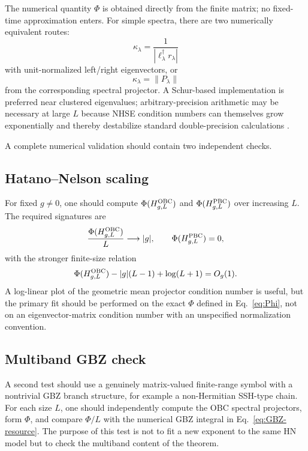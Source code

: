 \documentclass[reprint,amsmath,amssymb,aps,nofootinbib]{revtex4-2}
\newcommand{\norm}[1]{\left\lVert #1\right\rVert}
\newcommand{\PhiC}{\Phi}
\begin{document}
The numerical quantity \(\PhiC\) is obtained directly from the finite matrix;
no fixed-time approximation enters. For simple spectra, there are two
numerically equivalent routes:
\begin{equation}
\kappa_\lambda=\frac{1}{|\ell_\lambda^\dagger r_\lambda|}
\end{equation}
with unit-normalized left/right eigenvectors, or
\begin{equation}
\kappa_\lambda=\norm{P_\lambda}
\end{equation}
from the corresponding spectral projector. A Schur-based implementation is
preferred near clustered eigenvalues; arbitrary-precision arithmetic may be
necessary at large $L$ because NHSE condition numbers can themselves grow
exponentially and thereby destabilize standard double-precision
calculations \cite{FengEtAl2025}.

A complete numerical validation should contain two independent checks.

\subsection{Hatano--Nelson scaling}
For fixed $g\ne0$, one should compute \(\PhiC(H_{g,L}^{\rm OBC})\) and
\(\PhiC(H_{g,L}^{\rm PBC})\) over increasing $L$. The required signatures are
\begin{equation}
\frac{\PhiC(H_{g,L}^{\rm OBC})}{L}\longrightarrow |g|,
\qquad
\PhiC(H_{g,L}^{\rm PBC})=0,
\end{equation}
with the stronger finite-size relation
\begin{equation}
\PhiC(H_{g,L}^{\rm OBC})-|g|(L-1)+\log(L+1)=O_g(1).
\end{equation}
A log-linear plot of the geometric mean projector condition number is useful,
but the primary fit should be performed on the exact \(\PhiC\) defined in
Eq.~\eqref{eq:Phi}, not on an eigenvector-matrix condition number with an
unspecified normalization convention.

\subsection{Multiband GBZ check}
A second test should use a genuinely matrix-valued finite-range symbol with a
nontrivial GBZ branch structure, for example a non-Hermitian SSH-type chain.
For each size $L$, one should independently compute the OBC spectral
projectors, form \(\PhiC\), and compare \(\PhiC/L\) with the numerical GBZ
integral in Eq.~\eqref{eq:GBZ-resource}. The purpose of this test is not to
fit a new exponent to the same HN model but to check the multiband content of
the theorem.
\end{document}

